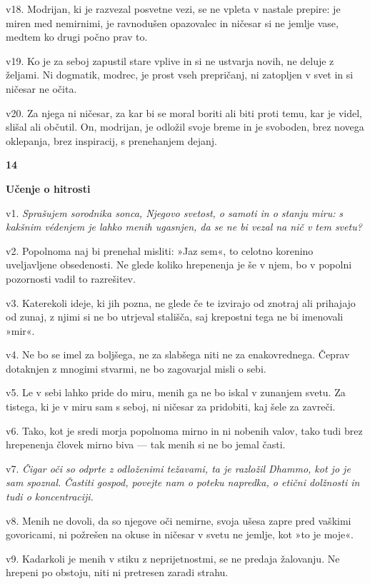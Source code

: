 v18. Modrijan, ki je razvezal posvetne vezi, se ne vpleta v nastale prepire: je miren med nemirnimi, je ravnodušen opazovalec in ničesar si ne jemlje vase, medtem ko drugi počno prav to.

v19. Ko je za seboj zapustil stare vplive in si ne ustvarja novih, ne deluje z željami. Ni dogmatik, modrec, je prost vseh prepričanj, ni zatopljen v svet in si ničesar ne očita.

v20. Za njega ni ničesar, za kar bi se moral boriti ali biti proti temu, kar je videl, slišal ali občutil. On, modrijan, je odložil svoje breme in je svoboden, brez novega oklepanja, brez inspiracij, s prenehanjem dejanj.

\textbf{14 }

\textbf{Učenje o hitrosti }

v1. \emph{Sprašujem sorodnika sonca, Njegovo svetost, o samoti in o stanju miru:} \emph{s kakšnim védenjem je lahko menih ugasnjen, da se ne bi vezal na nič v tem svetu?}

v2. Popolnoma naj bi prenehal misliti: »Jaz sem«, to celotno korenino uveljavljene obsedenosti. Ne glede koliko hrepenenja je še v njem, bo v popolni pozornosti vadil to razrešitev.

v3. Katerekoli ideje, ki jih pozna, ne glede če te izvirajo od znotraj ali prihajajo od zunaj, z njimi si ne bo utrjeval stališča, saj krepostni tega ne bi imenovali »mir«.

v4. Ne bo se imel za boljšega, ne za slabšega niti ne za enakovrednega. Čeprav dotaknjen z mnogimi stvarmi, ne bo zagovarjal misli o sebi.

v5. Le v sebi lahko pride do miru, menih ga ne bo iskal v zunanjem svetu. Za tistega, ki je v miru sam s seboj, ni ničesar za pridobiti, kaj šele za zavreči.

v6. Tako, kot je sredi morja popolnoma mirno in ni nobenih valov, tako tudi brez hrepenenja človek mirno biva --- tak menih si ne bo jemal časti.

v7. \emph{Čigar oči so odprte z odloženimi težavami, ta je razložil Dhammo, kot jo je sam spoznal.} \emph{Častiti gospod, povejte nam o poteku napredka, o etični dolžnosti in tudi o koncentraciji.}

v8. Menih ne dovoli, da so njegove oči nemirne, svoja ušesa zapre pred vaškimi govoricami, ni požrešen na okuse in ničesar v svetu ne jemlje, kot »to je moje«.

v9. Kadarkoli je menih v stiku z neprijetnostmi, se ne predaja žalovanju. Ne hrepeni po obstoju, niti ni pretresen zaradi strahu.


